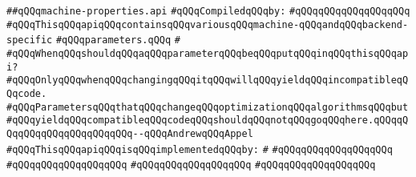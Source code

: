 \label{src/lib/compiler/back/low/main/main/machine-properties.api}
\verb|##qQQqmachine-properties.api|\newline
\newline
\verb|#qQQqCompiledqQQqby:|\newline
\verb|#qQQqqQQqqQQqqQQqqQQq|\newline
\newline
\newline
\newline
\verb|#qQQqThisqQQqapiqQQqcontainsqQQqvariousqQQqmachine-qQQqandqQQqbackend-specific|\newline
\verb|#qQQqparameters.qQQq|\newline
\verb|#|\newline
\verb|#qQQqWhenqQQqshouldqQQqaqQQqparameterqQQqbeqQQqputqQQqinqQQqthisqQQqapi?|\newline
\verb|#qQQqOnlyqQQqwhenqQQqchangingqQQqitqQQqwillqQQqyieldqQQqincompatibleqQQqcode.|\newline
\verb|#qQQqParametersqQQqthatqQQqchangeqQQqoptimizationqQQqalgorithmsqQQqbut|\newline
\verb|#qQQqyieldqQQqcompatibleqQQqcodeqQQqshouldqQQqnotqQQqgoqQQqhere.qQQqqQQqqQQqqQQqqQQqqQQqqQQq--qQQqAndrewqQQqAppel|\newline
\newline
\newline
\verb|#qQQqThisqQQqapiqQQqisqQQqimplementedqQQqby:|\newline
\verb|#|\newline
\verb|#qQQqqQQqqQQqqQQqqQQq|\newline
\verb|#qQQqqQQqqQQqqQQqqQQq|\newline
\verb|#qQQqqQQqqQQqqQQqqQQq|\newline
\verb|#qQQqqQQqqQQqqQQqqQQq|\newline
\newline
